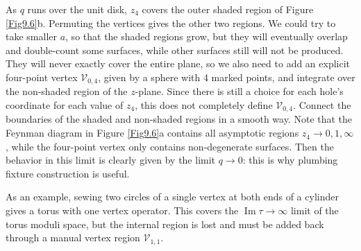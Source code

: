 As $q$ runs over the unit disk, $z_{4}$ covers the outer shaded region of Figure \ref{Fig9.6}b. Permuting the vertices gives the other two regions. 
We could try to take smaller $a$, so that the shaded regions grow, but they will eventually overlap and double-count some surfaces, while other surfaces still will not be produced. 
They will never exactly cover the entire plane, so we also need to add an explicit four-point vertex $\mathscr{V}_{0,4}$, given by a sphere with 4 marked points, 
and integrate over the non-shaded region of the $z$-plane.
Since there is still a choice for each hole's coordinate for each value of $z_{4}$, this does not completely define $\mathscr{V}_{0,4}$. 
Connect the boundaries of the shaded and non-shaded regions in a smooth way. Note that the Feynman diagram in Figure \ref{Fig9.6}a contains all asymptotic regions $z_{4} \rightarrow 0,1, \infty$, 
while the four-point vertex only contains non-degenerate surfaces. Then the behavior in this limit is clearly given by the limit $q \rightarrow 0$: this is why plumbing fixture construction is useful.

As an example, sewing two circles of a single vertex at both ends of a cylinder gives a torus with one vertex operator.
This covers the $\operatorname{Im} \tau \rightarrow \infty$ limit of the torus moduli space, but the internal region is lost and must be added back through a manual vertex region $\mathscr{V}_{1,1}$.

